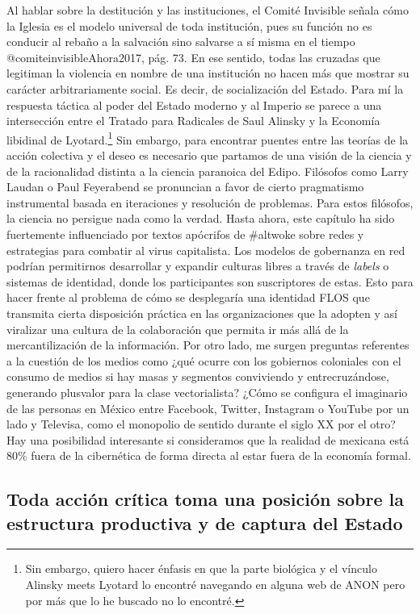\documentclass[
]{article}
\begin{document}
Al hablar sobre la destitución y las instituciones, el Comité Invisible
señala cómo la Iglesia es el modelo universal de toda institución, pues
su función no es conducir al rebaño a la salvación sino salvarse a sí
misma en el tiempo @comiteinvisibleAhora2017, pág. 73. En ese sentido,
todas las cruzadas que legitiman la violencia en nombre de una
institución no hacen más que mostrar su carácter arbitrariamente social.
Es decir, de socialización del Estado. Para mí la respuesta táctica al
poder del Estado moderno y al Imperio se parece a una intersección entre
el Tratado para Radicales de Saul Alinsky y la Economía libidinal de
Lyotard.\footnote{Sin embargo, quiero hacer énfasis en que la parte
  biológica y el vínculo Alinsky meets Lyotard lo encontré navegando en
  alguna web de ANON pero por más que lo he buscado no lo encontré.} Sin
embargo, para encontrar puentes entre las teorías de la acción colectiva
y el deseo es necesario que partamos de una visión de la ciencia y de la
racionalidad distinta a la ciencia paranoica del Edipo. Filósofos como
Larry Laudan o Paul Feyerabend se pronuncian a favor de cierto
pragmatismo instrumental basada en iteraciones y resolución de
problemas. Para estos filósofos, la ciencia no persigue nada como la
verdad. Hasta ahora, este capítulo ha sido fuertemente influenciado por
textos apócrifos de \#altwoke sobre redes y estrategias para combatir al
virus capitalista. Los modelos de gobernanza en red podrían permitirnos
desarrollar y expandir culturas libres a través de \emph{labels} o
sistemas de identidad, donde los participantes son suscriptores de
estas. Esto para hacer frente al problema de cómo se desplegaría una
identidad FLOS que transmita cierta disposición práctica en las
organizaciones que la adopten y así viralizar una cultura de la
colaboración que permita ir más allá de la mercantilización de la
información. Por otro lado, me surgen preguntas referentes a la cuestión
de los medios como ¿qué ocurre con los gobiernos coloniales con el
consumo de medios si hay masas y segmentos conviviendo y
entrecruzándose, generando plusvalor para la clase vectorialista? ¿Cómo
se configura el imaginario de las personas en México entre Facebook,
Twitter, Instagram o YouTube por un lado y Televisa, como el monopolio
de sentido durante el siglo XX por el otro? Hay una posibilidad
interesante si consideramos que la realidad de mexicana está 80\% fuera
de la cibernética de forma directa al estar fuera de la economía formal.

\hypertarget{toda-acciuxf3n-cruxedtica-toma-una-posiciuxf3n-sobre-la-estructura-productiva-y-de-captura-del-estado}{%
\subsection{Toda acción crítica toma una posición sobre la estructura
productiva y de captura del
Estado}\label{toda-acciuxf3n-cruxedtica-toma-una-posiciuxf3n-sobre-la-estructura-productiva-y-de-captura-del-estado}}
\end{document}
